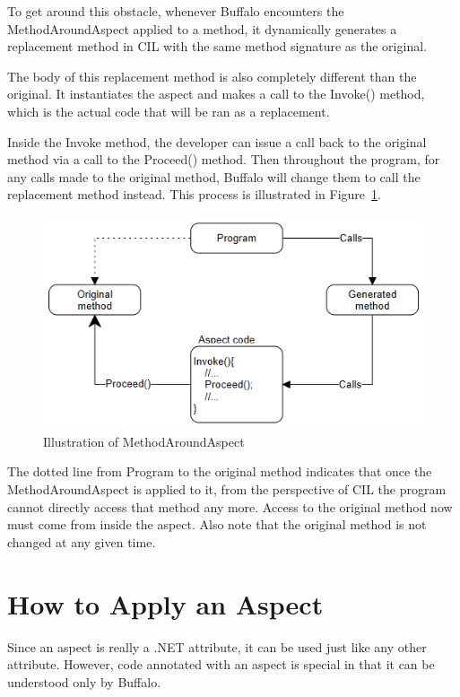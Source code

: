 To get around this obstacle, whenever Buffalo encounters the MethodAroundAspect applied to a method, it dynamically generates a replacement method in CIL with the same method signature as the original.

The body of this replacement method is also completely different than the original. It instantiates the aspect and makes a call to the Invoke() method, which is the actual code that will be ran as a replacement. 

Inside the Invoke method, the developer can issue a call back to the original method via a call to the Proceed() method. Then throughout the program, for any calls made to the original method, Buffalo will change them to call the replacement method instead. This process is illustrated in Figure~\ref{around_overview}.

\begin{figure}[H]
  \includegraphics[scale=1.0]{AroundOverview3.PNG}
  \centering
  \caption{Illustration of MethodAroundAspect\label{around_overview}}
\end{figure}

The dotted line from Program to the original method indicates that once the MethodAroundAspect is applied to it, from the perspective of CIL the program cannot directly access that method any more. Access to the original method now must come from inside the aspect. Also note that the original method is not changed at any given time.


\section{How to Apply an Aspect}

Since an aspect is really a .NET attribute, it can be used just like any other attribute. However, code annotated with an aspect is special in that it can be understood only by Buffalo.

